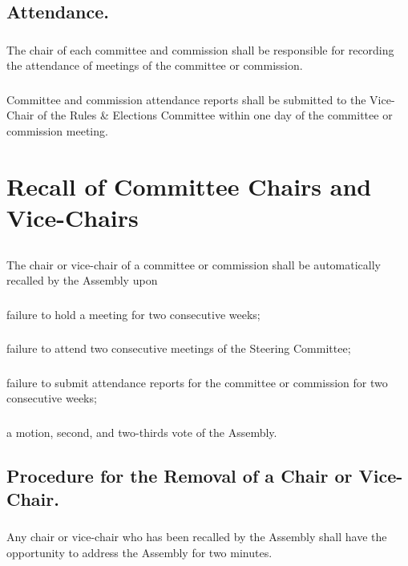 \documentclass{rules}
\begin{document}
\subsection{Attendance.}
\subsubsection{}
The chair of each committee and commission shall be responsible for recording the attendance of meetings of the committee or commission. 
\subsubsection{}
Committee and commission attendance reports shall be submitted to the Vice-Chair of the Rules \& Elections Committee within one day of the committee or commission meeting.

\section{Recall of Committee Chairs and Vice-Chairs}
\subsection{}
The chair or vice-chair of a committee or commission shall be automatically recalled by the Assembly upon
\subsubsection{}
failure to hold a meeting for two consecutive weeks;
\subsubsection{}
failure to attend two consecutive meetings of the Steering Committee;
\subsubsection{}
failure to submit attendance reports for the committee or commission for two consecutive weeks;
\subsubsection{}
a motion, second, and two-thirds vote of the Assembly.
\subsection{Procedure for the Removal of a Chair or Vice-Chair.}
\subsubsection{}
Any chair or vice-chair who has been recalled by the Assembly shall have the opportunity to address the Assembly for two minutes.
\end{document}

